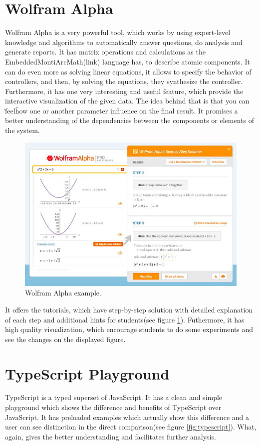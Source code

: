 \section{Wolfram Alpha}
Wolfram Alpha is a very powerful tool, which works by using expert-level knowledge and algorithms to automatically answer questions, do analysis and generate reports. It has matrix operations and calculations as the EmbeddedMontiArcMath(link) language has, to describe atomic components. It can do even more as solving linear equations, it allows to specify the behavior of controllers, and then, by solving the equations, they synthesize the controller. Furthermore, it has one very interesting and useful feature, which provide the interactive visualization of the given data. The idea behind that is that you can \"feel\" how one or another parameter influence on the final result. It promises a better understanding of the dependencies between the components or elements of the system.

\begin{figure}[h!]
    \centering
    \includegraphics[width=0.7\linewidth]{src/pic/wolfram}
    \caption{Wolfram Alpha example.}
    \label{fig:wolfram}
\end{figure}

It offers the tutorials, which have step-by-step solution with detailed explanation of each step and additional hints for students(see figure \ref{fig:wolfram}). Futhermore, it has high quality visualization, which encourage students to do some experiments and see the changes on the displayed figure.

\section{TypeScript Playground}
TypeScript is a typed superset of JavaScript. It has a clean and simple playground which shows the difference and benefits of TypeScript over JavaScript. It has preloaded examples which actually show this difference and a user can see distinction in the direct comparison(see figure \ref{fig:typescript}). What, again, gives the better understanding and facilitates further analysis.

